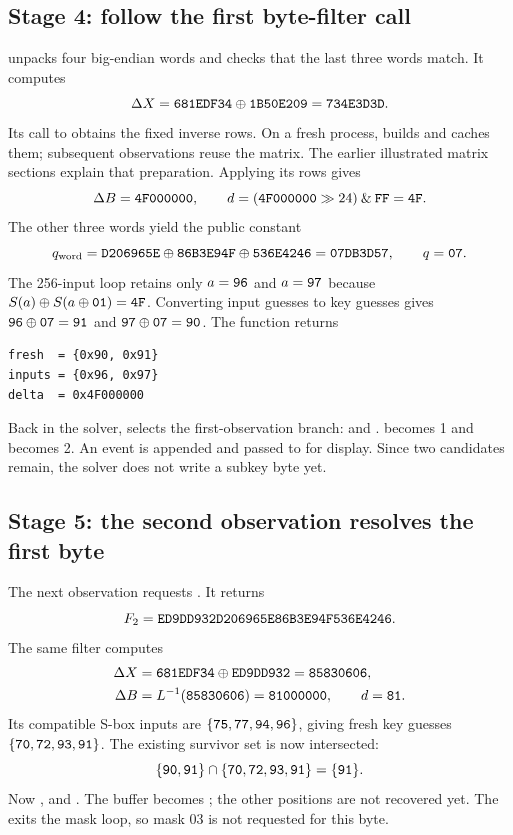 \subsection{Stage 4: follow the first byte-filter call}
 unpacks four big-endian words
and checks that the last three words match. It computes
\[
\Delta X=\texttt{681EDF34}\mathbin{\oplus}\texttt{1B50E209}=\texttt{734E3D3D}.
\]
Its call to  obtains the fixed inverse rows.
On a fresh process,  builds and caches them; subsequent
observations reuse the matrix. The earlier illustrated matrix sections explain
that preparation. Applying its rows gives
\[
\Delta B=\texttt{4F000000},\qquad
d=(\texttt{4F000000}\gg24)\mathbin{\&}\texttt{FF}=\texttt{4F}.
\]
The other three words yield the public constant
\[
q_{\rm word}=\texttt{D206965E}\mathbin{\oplus}\texttt{86B3E94F}\mathbin{\oplus}\texttt{536E4246}
=\texttt{07DB3D57},\qquad q=\texttt{07}.
\]
The 256-input loop retains only $a=\texttt{96}$ and $a=\texttt{97}$ because
$S(a)\mathbin{\oplus} S(a\mathbin{\oplus}\texttt{01})=\texttt{4F}$.
Converting input guesses to key guesses gives
$\texttt{96}\mathbin{\oplus}\texttt{07}=\texttt{91}$ and
$\texttt{97}\mathbin{\oplus}\texttt{07}=\texttt{90}$.
The function returns
\begin{Verbatim}
fresh  = {0x90, 0x91}
inputs = {0x96, 0x97}
delta  = 0x4F000000
\end{Verbatim}
Back in the solver,  selects the first-observation branch:
 and .
 becomes 1 and  becomes 2. An event is appended
and passed to  for display. Since two candidates remain,
the solver does not write a subkey byte yet.

\subsection{Stage 5: the second observation resolves the first byte}
The next observation requests . It returns
\[
F_2=\texttt{ED9DD932D206965E86B3E94F536E4246}.
\]
The same filter computes
\[
\begin{aligned}
\Delta X&=\texttt{681EDF34}\mathbin{\oplus}\texttt{ED9DD932}=\texttt{85830606},\\
\Delta B&=L^{-1}(\texttt{85830606})=\texttt{81000000},\qquad d=\texttt{81}.
\end{aligned}
\]
Its compatible S-box inputs are $\{\texttt{75},\texttt{77},\texttt{94},\texttt{96}\}$,
giving fresh key guesses $\{\texttt{70},\texttt{72},\texttt{93},\texttt{91}\}$.
The existing survivor set is now intersected:
\[
\{\texttt{90},\texttt{91}\}\cap\{\texttt{70},\texttt{72},\texttt{93},\texttt{91}\}
=\{\texttt{91}\}.
\]
Now ,  and .
The buffer becomes ; the other positions are not recovered yet.
The  exits the mask loop, so mask 03 is not requested for this byte.

